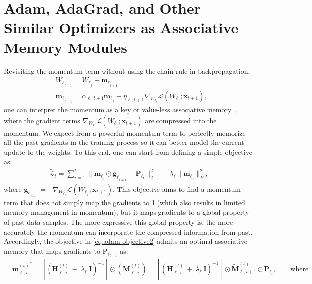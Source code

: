 \documentclass{article}
\newcommand{\citep}{\parencite}
\newcommand{\vp}{\boldsymbol{P}}
\begin{document}
{\section{Adam, AdaGrad, and Other Similar Optimizers as Associative Memory Modules}\label{app:adam}
Revisiting the momentum term without using the chain rule in backpropagation,
\begin{align}\nonumber
    &{W_{\ell}}_{_{t+1}} = {W_{\ell}}_{_{t}} + {\boldsymbol{m}_{\ell}}_{_{t+1}}\\ \label{eq:momentum2}
    &{\boldsymbol{m}_{\ell}}_{_{t+1}} = \alpha_{\ell, t+1} {\boldsymbol{m}_{\ell}}_{_{t}} - \eta_{\ell, t+1} \nabla_{{W_{\ell}}_{_{t}}} \mathcal{L}\left({W_{\ell}}_{_{t}}; \boldsymbol{x}_{t+1}\right), 
\end{align}
one can interpret the momentum as a key or value-less associative memory~\citep[see Section 5]{behrouz2025Miras}, where the gradient terms $\nabla_{{W_{\ell}}_{_{t}}} \mathcal{L}\left({W_{\ell}}_{_{t}}; \boldsymbol{x}_{t+1}\right)$ are compressed into the momentum. We expect from a powerful momentum term to perfectly memorize all the past gradients in the training process so it can better model the current update to the weights. To this end, one can  start from  defining a simple objective as:
\begin{align}\label{eq:adam-objective2}
    \tilde{\mathcal{L}}_t = \sum_{i = 1}^{t} \| {\boldsymbol{m}_{\ell}}_{_{t}}  \odot {\boldsymbol{g}_{\ell}}_{_{i + 1}} - \vp_{\ell_{t}} \|_{2}^{2} \:\: +\:\: \lambda_{\ell} \|{\boldsymbol{m}_{\ell}}_{_{t}}\|^2_F ,
\end{align}
where ${\boldsymbol{g}_{\ell}}_{_{t + 1}} = - \nabla_{{W_{\ell}}_{_{t}}} \mathcal{L}\left({W_{\ell}}_{_{t}}; \boldsymbol{x}_{t+1}\right)$. This objective aims to find a momentum term that does not simply map the gradients to 1 (which also results in limited memory management in momentum), but it maps gradients to a global property of past data samples. The more expressive this global property is, the more accurately the momentum can incorporate the compressed information from past. Accordingly, the objective in \autoref{eq:adam-objective2} admits an optimal associative memory that maps gradients to $\vp_{\ell_{t+1}}$ as:
\begin{align}\nonumber
    &{\boldsymbol{m}^{(t)}_{\ell, i}}^{*} = \left[  \left( \boldsymbol{H}^{(t)}_{\ell, i} \: + \: \lambda_{\ell}\: \boldsymbol{I} \right)^{-1}\right] \odot \left( \boldsymbol{M}^{(t)}_{\ell, i}\right) = \left[  \left( \boldsymbol{H}^{(t)}_{\ell, i} \: + \: \lambda_{\ell}\: \boldsymbol{I} \right)^{-1}\right] \odot \tilde{\boldsymbol{M}}^{(t)}_{\ell, i+1} \odot \vp_{\ell_{t}}, \qquad \text{where} \\ \nonumber

\end{align}}
\end{document}
